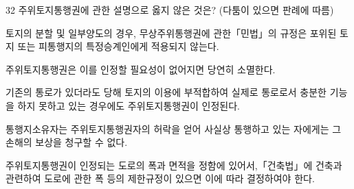\begin{question}{32}
주위토지통행권에 관한 설명으로 옳지 않은 것은? (다툼이 있으면 판례에 따름)
\begin{choices}
  \item 토지의 분할 및 일부양도의 경우, 무상주위통행권에 관한「민법」의 규정은 포위된 토지 또는 피통행지의 특정승계인에게 적용되지 않는다.
  \item 주위토지통행권은 이를 인정할 필요성이 없어지면 당연히 소멸한다.
  \item 기존의 통로가 있더라도 당해 토지의 이용에 부적합하여 실제로 통로로서 충분한 기능을 하지 못하고 있는 경우에도 주위토지통행권이 인정된다.
  \item 통행지소유자는 주위토지통행권자의 허락을 얻어 사실상 통행하고 있는 자에게는 그 손해의 보상을 청구할 수 없다.
  \item 주위토지통행권이 인정되는 도로의 폭과 면적을 정함에 있어서,「건축법」에 건축과 관련하여 도로에 관한 폭 등의 제한규정이 있으면 이에 따라 결정하여야 한다.
\end{choices}
\end{question}
